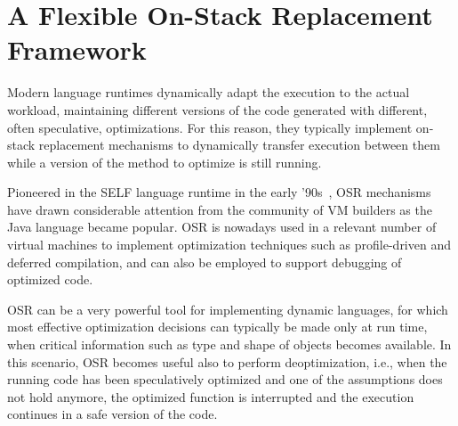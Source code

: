 
\section{A Flexible On-Stack Replacement Framework}

Modern language runtimes dynamically adapt the execution to the actual workload, maintaining different versions of the code generated with different, often speculative, optimizations. For this reason, they typically implement on-stack replacement mechanisms to dynamically transfer execution between them while a version of the method to optimize is still running.

Pioneered in the SELF language runtime in the early '90s~\cite{Holzle92}, OSR mechanisms have drawn considerable attention from the community of VM builders as the Java language became popular. OSR is nowadays used in a relevant number of virtual machines to implement optimization techniques such as profile-driven and deferred compilation, and can also be employed to support debugging of optimized code.

\noindent OSR can be a very powerful tool for implementing dynamic languages, for which most effective optimization decisions can typically be made only at run time, when critical information such as type and shape of objects becomes available. In this scenario, OSR becomes useful also to perform deoptimization, i.e., when the running code has been speculatively optimized and one of the assumptions does not hold anymore, the optimized function is interrupted and the execution continues in a safe version of the code.

